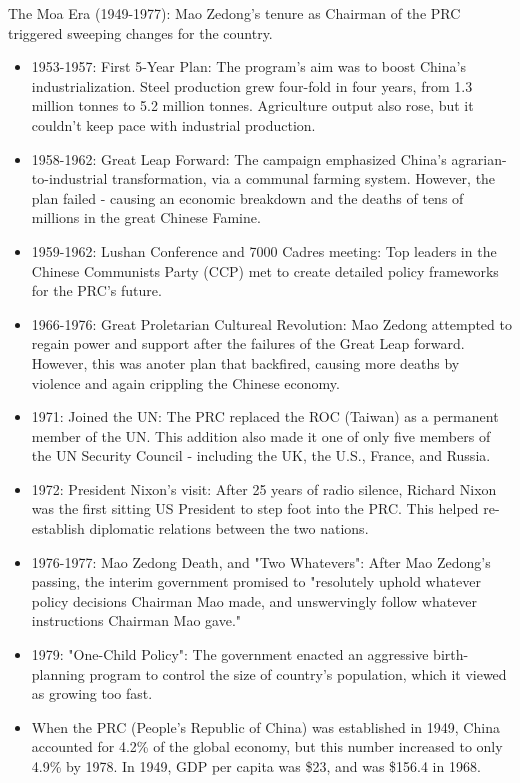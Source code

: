 The Moa Era (1949-1977): Mao Zedong's tenure as Chairman of the PRC triggered
sweeping changes for the country.

\begin{itemize}
    \item 1953-1957: First 5-Year Plan: The program's aim was to boost
        China's industrialization. Steel production grew four-fold in four
        years, from 1.3 million tonnes to 5.2 million tonnes. Agriculture
        output also rose, but it couldn't keep pace with industrial production.
    \item 1958-1962: Great Leap Forward: The campaign emphasized China's
        agrarian-to-industrial transformation, via a communal farming system.
        However, the plan failed - causing an economic breakdown and the deaths
        of tens of millions in the great Chinese Famine.
    \item 1959-1962: Lushan Conference and 7000 Cadres meeting:
        Top leaders in the Chinese Communists Party (CCP) met to create
        detailed policy frameworks for the PRC's future.
    \item 1966-1976: Great Proletarian Cultureal Revolution:
        Mao Zedong attempted to regain power and support after the failures
        of the Great Leap forward. However, this was anoter plan that backfired,
        causing more deaths by violence and again crippling the Chinese economy.
    \item 1971: Joined the UN: The PRC replaced the ROC (Taiwan) as a permanent
        member of the UN. This addition also made it one of only five members
        of the UN Security Council - including the UK, the U.S., France, and
        Russia.
    \item 1972: President Nixon's visit: After 25 years of radio silence,
        Richard Nixon was the first sitting US President to step foot into the
        PRC. This helped re-establish diplomatic relations between the two nations.
    \item 1976-1977: Mao Zedong Death, and "Two Whatevers": After Mao Zedong's
        passing, the interim government promised to "resolutely uphold whatever
        policy decisions Chairman Mao made, and unswervingly follow whatever
        instructions Chairman Mao gave."
    \item 1979: "One-Child Policy": The government enacted an aggressive
        birth-planning program to control the size of country's population,
        which it viewed as growing too fast.
    \item When the PRC (People's Republic of China) was established in
        1949, China accounted for 4.2\% of the global economy, but this
        number increased to only 4.9\% by 1978. In 1949, GDP per capita was
        \$23, and was \$156.4 in 1968.
\end{itemize}

